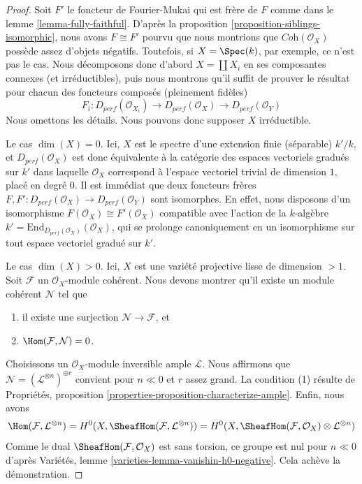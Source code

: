 \begin{proof}
Soit $F'$ le foncteur de Fourier-Mukai qui est frère de $F$
comme dans le lemme \ref{lemma-fully-faithful}.
D'après la proposition \ref{proposition-siblings-isomorphic}, nous avons $F \cong F'$
pourvu que nous montrions que $\textit{Coh}(\mathcal{O}_X)$ possède assez
d'objets négatifs. Toutefois, si $X = \Spec(k)$, par exemple,
ce n'est pas le cas. Nous décomposons donc d'abord $X = \coprod X_i$
en ses composantes connexes (et irréductibles), puis nous
montrons qu'il suffit de prouver le résultat pour chacun des
foncteurs composés (pleinement fidèles)
$$
F_i :
D_{perf}(\mathcal{O}_{X_i}) \to
D_{perf}(\mathcal{O}_X) \to
D_{perf}(\mathcal{O}_Y)
$$
Nous omettons les détails. Nous pouvons donc supposer $X$ irréductible.

\medskip\noindent
Le cas $\dim(X) = 0$. Ici, $X$ est le spectre d'une extension finie (séparable)
$k'/k$, et $D_{perf}(\mathcal{O}_X)$ est donc équivalente à la catégorie
des espaces vectoriels gradués sur $k'$ dans laquelle
$\mathcal{O}_X$ correspond à
l'espace vectoriel trivial de dimension $1$, placé en degré $0$.
Il est immédiat que deux foncteurs frères
$F, F' : D_{perf}(\mathcal{O}_X) \to D_{perf}(\mathcal{O}_Y)$
sont isomorphes. En effet, nous disposons d'un isomorphisme
$F(\mathcal{O}_X) \cong F'(\mathcal{O}_X)$
compatible avec l'action de la $k$-algèbre
$k' = \text{End}_{D_{perf}(\mathcal{O}_X)}(\mathcal{O}_X)$,
qui se prolonge canoniquement en un isomorphisme sur tout espace vectoriel gradué sur $k'$.

\medskip\noindent
Le cas $\dim(X) > 0$. Ici, $X$ est une variété projective lisse
de dimension $> 1$. Soit $\mathcal{F}$ un
$\mathcal{O}_X$-module cohérent.
Nous devons montrer qu'il existe un module cohérent $\mathcal{N}$ tel que
\begin{enumerate}
\item il existe une surjection $\mathcal{N} \to \mathcal{F}$, et
\item $\Hom(\mathcal{F}, \mathcal{N}) = 0$.
\end{enumerate}
Choisissons un $\mathcal{O}_X$-module inversible ample $\mathcal{L}$.
Nous affirmons que $\mathcal{N} = (\mathcal{L}^{\otimes n})^{\oplus r}$
convient pour $n \ll 0$ et $r$ assez grand.
La condition (1) résulte de
Propriétés, proposition \ref{properties-proposition-characterize-ample}.
Enfin, nous avons
$$
\Hom(\mathcal{F}, \mathcal{L}^{\otimes n}) =
H^0(X, \SheafHom(\mathcal{F}, \mathcal{L}^{\otimes n})) =
H^0(X, \SheafHom(\mathcal{F}, \mathcal{O}_X) \otimes \mathcal{L}^{\otimes n})
$$
Comme le dual $\SheafHom(\mathcal{F}, \mathcal{O}_X)$ est sans torsion, ce groupe
est nul pour $n \ll 0$ d'après Variétés, lemme
\ref{varieties-lemma-vanishin-h0-negative}. Cela achève la démonstration.
\end{proof}


